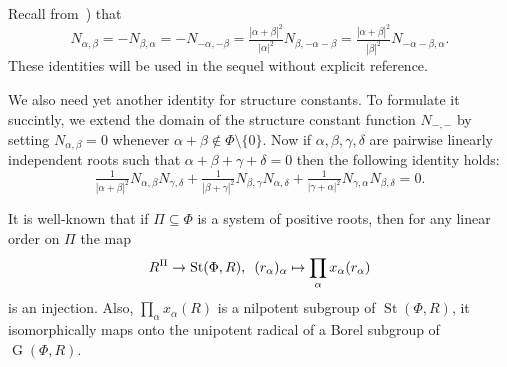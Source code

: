 \documentclass{article}
\numberwithin{equation}{section}
\theoremstyle{definition}
\theoremstyle{remark}
\DeclareMathOperator\St{St}
\DeclareMathOperator\GG{G}
\begin{document}
Recall from~\cite[\S~14]{VP}) that
\begin{equation} \label{eq:sc-ids-sl} N_{\alpha, \beta} = -N_{\beta,\alpha} = - N_{-\alpha, -\beta} = \tfrac{|\alpha+\beta|^2}{|\alpha|^2} N_{\beta, -\alpha-\beta} = \tfrac{|\alpha+\beta|^2}{|\beta|^2} N_{-\alpha-\beta, \alpha}. \end{equation}
These identities will be used in the sequel without explicit reference. 

We also need yet another identity for structure constants.
To formulate it succintly, we extend the domain of the structure constant function $N_{-,-}$ by setting $N_{\alpha, \beta} = 0$ whenever $\alpha+\beta\not\in\Phi\setminus\{0\}$.
Now if $\alpha, \beta, \gamma, \delta$ are pairwise linearly independent roots such that $\alpha+\beta+\gamma+\delta = 0$ then the following identity holds:
\begin{equation} \label{eq:cocycle} \tfrac{1}{|\alpha+\beta|^2} N_{\alpha,\beta} N_{\gamma,\delta} + \tfrac{1}{|\beta+\gamma|^2} N_{\beta,\gamma} N_{\alpha,\delta} + \tfrac{1}{|\gamma+\alpha|^2} N_{\gamma,\alpha} N_{\beta,\delta} = 0. \end{equation}

It is well-known that if \(\Pi \subseteq \Phi\) is a system of positive roots, then for any linear order on \(\Pi\) the map
\begin{equation} \label{eq:uni-rad}
R^\Pi \to \St(\Phi, R), \enskip (r_\alpha)_\alpha \mapsto \prod_\alpha x_\alpha(r_\alpha)
\end{equation}
is an injection. Also, \(\prod_\alpha x_\alpha(R)\) is a nilpotent subgroup of \(\St(\Phi, R)\), it isomorphically maps onto the unipotent radical of a Borel subgroup of \(\GG(\Phi, R)\).
\end{document}
